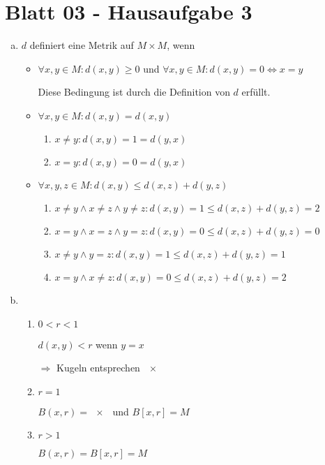 \documentclass{scrreprt}
\begin{document}
\section{Blatt 03 - Hausaufgabe 3}
\begin{enumerate}[a)]
\item $d$ definiert eine Metrik auf $M \times M$, wenn
  \begin{itemize}
  \item $\forall x, y \in M \colon d(x,y) \geq 0$ und
    $\forall x,y \in M \colon d(x,y) = 0 \iff x = y$

    Diese Bedingung ist durch die Definition von $d$ erfüllt.

  \item $\forall x,y \in M \colon d(x, y) = d(x, y)$
    \begin{enumerate}[label={Fall \arabic*:},leftmargin=*]
    \item $x \ne y \colon d(x, y) = 1 = d(y, x)$
    \item $x = y \colon d(x, y) = 0 = d(y, x)$
    \end{enumerate}

  \item $\forall x,y,z \in M \colon d(x,y) \leq d(x,z) + d(y,z)$
    \begin{enumerate}[label={Fall \arabic*:},leftmargin=*]
    \item $x \ne y \land x \ne z \land y \ne z \colon d(x, y) = 1 \leq d(x, z) + d(y, z) = 2$
    \item $x = y \land x = z \land y = z \colon d(x, y) = 0 \leq d(x, z) + d(y, z) = 0$
    \item $x \ne y \land y = z \colon d(x, y) = 1 \leq d(x, z) + d(y, z) = 1$
    \item $x = y \land x \ne z \colon d(x, y) = 0 \leq d(x, z) + d(y, z) = 2$
    \end{enumerate}

  \end{itemize}

\item
  \begin{enumerate}[label={Fall \arabic*:},leftmargin=*]
  \item $0 < r < 1$

    $d(x, y) < r$ wenn $y = x$

    $\Rightarrow$ Kugeln entsprechen $\qty{x}$
  \item $r = 1$

    $B(x, r) = \qty{x}$ und $B[x,r] = M$
  \item $r > 1$

    $B(x, r) = B[x, r] = M$
  \end{enumerate}
\end{enumerate}
\end{document}
